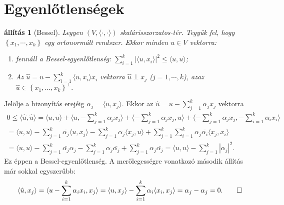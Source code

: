\documentclass[9pt, a4paper, showtrims]{memoir}
\makeatletter
\renewenvironment{proof}[1][\proofname]
    {\par\pushQED{\qed}%
    \normalfont \topsep6\p@\@plus6\p@\relax
    \trivlist
    \item[\hskip\labelsep
        \itshape
    #1\@addpunct{:}]\ignorespaces}
    {\popQED\endtrivlist\@endpefalse}
\theoremstyle{plain}
\newtheorem{proposition}{állítás}[chapter]
\theoremstyle{remark}
\theoremstyle{definition}
\DeclareMathOperator{\lin}{lin}
\newcommand{\ip}[2]{\langle#1,#2\rangle}
\makeatother
\begin{document}
\section{Egyenlőtlenségek}
\begin{proposition}[Bessel]\label{pr:Bessel}
    Legyen $\left( V,\ip{\cdot}{\cdot} \right)$ skalárisszorzatos-tér.
    Tegyük fel, hogy $\left\{ x_1,\cdots,x_k \right\}$ egy ortonormált rendszer.
    Ekkor minden $u\in V$ vektorra:
    \begin{enumerate}
        \item
            fennáll a  \emph{Bessel-egyenlőtlenség:}
            $\sum_{i=1}^k|\ip{u}{x_i}|^2\leq\ip{u}{u}$; 
        \item
            Az 
            \(
            \hat{u}=u-\sum_{i=1}^k\ip{u}{x_i}x_i
            \) 
            vektorra $\hat{u}\perp x_j$
            ($j=1,\cdots,k$), azaz
            \(
            \hat{u}\in
            \left\{ x_1,\dots,x_k \right\}^\perp
            .
            \)
            \qedhere
    \end{enumerate}
\end{proposition}
\begin{proof}
    Jelölje a bizonyítás erejéig 
    \begin{math}
        \alpha_j=\ip{u}{x_j}.
    \end{math}
    Ekkor az $\hat{u}=u-\sum_{j=1}^k\alpha_jx_j$ vektorra
    \begin{multline*}
        0
        \leq
        \ip{\hat{u}}{\hat{u}}
        =
        \ip{u}{u}+\ip{u}{-\sum_{j=1}^k\alpha_jx_j}+\ip{-\sum_{j=1}^k\alpha_jx_j}{u}+\ip{-\sum_{j=1}^k\alpha_jx_j}{-\sum_{i=1}^k\alpha_ix_i}
        \\
        =
        \ip{u}{u}-\sum_{j=1}^k\overline{\alpha_j}\ip{u}{x_j}-\sum_{j=1}^k\alpha_j\ip{x_j}{u}+\sum_{j=1}^k\sum_{i=1}^k\alpha_j\overline{\alpha_i}\ip{x_j}{x_i}
        \\
        =
        \ip{u}{u}-\sum_{j=1}^k\overline{\alpha_j}\alpha_j-\sum_{j=1}^k\alpha_j\overline{\alpha_j}+\sum_{j=1}^k\alpha_j\overline{\alpha_j}
        =\ip{u}{u}-\sum_{j=1}^k|\alpha_j|^2.
    \end{multline*}
    Ez éppen a Bessel-egyenlőtlenség.
    A merőlegességre vonatkozó második állítás már sokkal egyszerűbb:
    \[
        \ip{\hat{u}}{x_j}
        =
        \ip{u-\sum_{i=1}^k\alpha_ix_i}{x_j}
        =
        \ip{u}{x_j}-\sum_{i=1}^k\alpha_i\ip{x_i}{x_j}
        =
        \alpha_j-\alpha_j
        =
        0.
        \qedhere
    \]
\end{proof}
\end{document}
